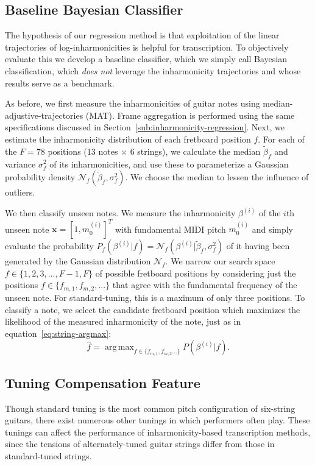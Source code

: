 \documentclass[convention,peer-reviewed]{aesconf}
\DeclareMathOperator*{\argmax}{arg\,max}
\begin{document}
\subsection{Baseline Bayesian Classifier}
The hypothesis of our regression method is that exploitation of the linear trajectories of log-inharmonicities is helpful for transcription. To objectively evaluate this we develop a baseline classifier, which we simply call Bayesian classification, which \textit{does not} leverage the inharmonicity trajectories and whose results serve as a benchmark.

As before, we first measure the inharmonicities of guitar notes using median-adjustive-trajectories (MAT). Frame aggregation is performed using the same specifications discussed in Section~\ref{sub:inharmonicity-regression}. Next, we estimate the inharmonicity distribution of each fretboard position $f$. For each of the $F=78$ positions (13 notes $\times$ 6 strings), we calculate the median $\tilde{\beta}_f$ and variance $\sigma^2_f$ of its inharmonicities, and use these to parameterize a Gaussian probability density $\mathcal{N}_f(\tilde{\beta}_f,\sigma^2_f)$. We choose the median to lessen the influence of outliers.

We then classify unseen notes. We measure the inharmonicity $\beta^{(i)}$ of the $i$th unseen note $\mathbf{x}=[1,m_0^{(i)}]^T$ with fundamental MIDI pitch $m_0^{(i)}$ and simply evaluate the probability $P_f(\beta^{(i)} | f) = \mathcal{N}_f(\beta^{(i)} | \tilde{\beta}_f,\sigma^2_f)$ of it having been generated by the Gaussian distribution $\mathcal{N}_f$. We narrow our search space $f \in \{1,2,3,...,F-1,F\}$ of possible fretboard positions by considering just the positions $f \in \{f_{m,1},f_{m,2},...\}$ that agree with the fundamental frequency of the unseen note. For standard-tuning, this is a maximum of only three positions. To classify a note, we select the candidate fretboard position which maximizes the likelihood of the measured inharmonicity of the note, just as in equation~\eqref{eq:string-argmax}:
\begin{equation}
\hat{f} = \argmax_{f\in\{f_{m,1},f_{m,2}...\}}P(\beta^{(i)} | f).
\label{eq:string-classification-mle}
\end{equation}


\subsection{Tuning Compensation Feature}
Though standard tuning is the most common pitch configuration of six-string guitars, there exist numerous other tunings in which performers often play. These tunings can affect the performance of inharmonicity-based transcription methods, since the tensions of alternately-tuned guitar strings differ from those in standard-tuned strings.
\end{document}
